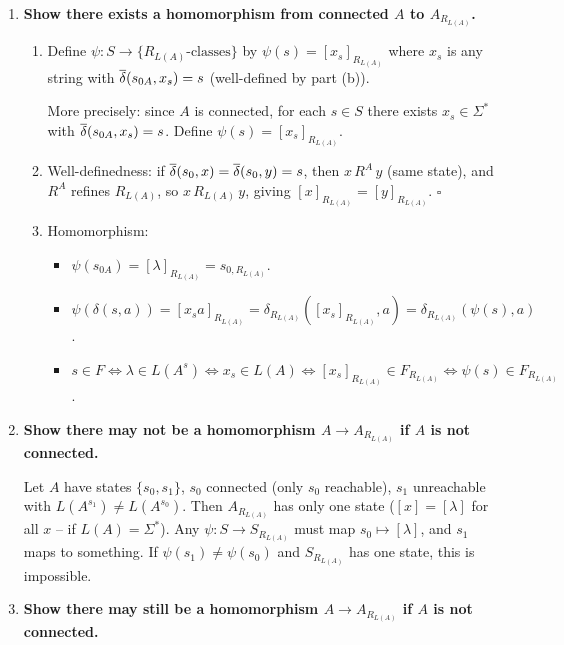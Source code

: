 \begin{enumerate}[{3.}1.]
\item \textbf{Show there exists a homomorphism from connected $A$ to $A_{R_{L(A)}}$.}

\begin{enumerate}
\item Define $\psi: S\to\{R_{L(A)}\text{-classes}\}$ by $\psi(s)=[x_s]_{R_{L(A)}}$ where $x_s$ is any string with $\overline{\delta}(s_{0A},x_s)=s$ (well-defined by part (b)).

More precisely: since $A$ is connected, for each $s\in S$ there exists $x_s\in\Sigma^*$ with $\overline{\delta}(s_{0A},x_s)=s$. Define $\psi(s)=[x_s]_{R_{L(A)}}$.

\item Well-definedness: if $\overline{\delta}(s_0,x)=\overline{\delta}(s_0,y)=s$, then $x\,R^A\,y$ (same state), and $R^A$ refines $R_{L(A)}$, so $x\,R_{L(A)}\,y$, giving $[x]_{R_{L(A)}}=[y]_{R_{L(A)}}$. $\square$

\item Homomorphism:
\begin{itemize}
\item $\psi(s_{0A})=[\lambda]_{R_{L(A)}}=s_{0,R_{L(A)}}$. \checkmark
\item $\psi(\delta(s,a))=[x_s a]_{R_{L(A)}}=\delta_{R_{L(A)}}([x_s]_{R_{L(A)}},a)=\delta_{R_{L(A)}}(\psi(s),a)$. \checkmark
\item $s\in F\Leftrightarrow\lambda\in L(A^s)\Leftrightarrow x_s\in L(A)\Leftrightarrow[x_s]_{R_{L(A)}}\in F_{R_{L(A)}}\Leftrightarrow\psi(s)\in F_{R_{L(A)}}$. \checkmark
\end{itemize}
\end{enumerate}

\item \textbf{Show there may not be a homomorphism $A\to A_{R_{L(A)}}$ if $A$ is not connected.}

Let $A$ have states $\{s_0,s_1\}$, $s_0$ connected (only $s_0$ reachable), $s_1$ unreachable with $L(A^{s_1})\neq L(A^{s_0})$. Then $A_{R_{L(A)}}$ has only one state ($[x]=[\lambda]$ for all $x$ -- if $L(A)=\Sigma^*$). Any $\psi: S\to S_{R_{L(A)}}$ must map $s_0\mapsto[\lambda]$, and $s_1$ maps to something. If $\psi(s_1)\neq\psi(s_0)$ and $S_{R_{L(A)}}$ has one state, this is impossible.

\item \textbf{Show there may still be a homomorphism $A\to A_{R_{L(A)}}$ if $A$ is not connected.}


\end{enumerate}
